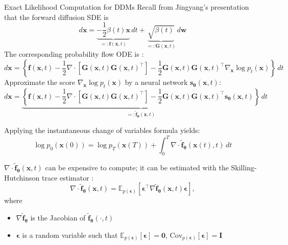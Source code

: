 \documentclass{beamer}
\begin{document}
\begin{frame}[allowframebreaks]{Exact Likelihood Computation for DDMs}
    Recall from Jingyang's presentation that the forward diffusion SDE is 
    \[
    d\mathbf{x} = \underbrace{-\frac{1}{2}\beta(t)\mathbf{x}}_{=: \mathbf{f}(\mathbf{x}, t)}\,dt + \underbrace{\sqrt{\beta(t)}}_{=: \mathbf{G}(\mathbf{x}, t)}\,d\mathbf{w}
    \]
    The corresponding probability flow ODE is \cite{song2021scor}:
    \[
    d\mathbf{x}
    = \left\{\mathbf{f}(\mathbf{x}, t) - \frac{1}{2}\nabla \cdot \left[\mathbf{G}(\mathbf{x}, t)\mathbf{G}(\mathbf{x}, t)^{\top}\right] - \frac{1}{2}\mathbf{G}(\mathbf{x}, t)\mathbf{G}(\mathbf{x}, t)^{\top}\nabla_{\mathbf{x}}\log p_t(\mathbf{x})\right\}\,dt
    \]
    Approximate the score $\nabla_{\mathbf{x}}\log p_t(\mathbf{x})$ by a neural network $\mathbf{s}_{\mathbf{\theta}}(\mathbf{x}, t)$:
    \[
    d\mathbf{x}
    = \underbrace{\left\{\mathbf{f}(\mathbf{x}, t) - \frac{1}{2}\nabla \cdot \left[\mathbf{G}(\mathbf{x}, t)\mathbf{G}(\mathbf{x}, t)^{\top}\right] - \frac{1}{2}\mathbf{G}(\mathbf{x}, t)\mathbf{G}(\mathbf{x}, t)^{\top}\mathbf{s}_{\mathbf{\theta}}(\mathbf{x}, t)\right\}}_{=: \mathbf{\tilde{f}}_{\mathbf{\theta}}(\mathbf{x}, t)}\,dt
    \]

    \framebreak

    Applying the instantaneous change of variables formula \cite{chen2018neur} yields:
    \begin{equation}\label{eq:chg_of_var_result}
        \log p_0(\mathbf{x}(0)) = \log p_T(\mathbf{x}(T)) + \int_{0}^{T} \nabla \cdot \mathbf{\tilde{f}}_{\mathbf{\theta}}(\mathbf{x}(t), t)\,dt
    \end{equation}

    $\nabla \cdot \mathbf{\tilde{f}}_{\mathbf{\theta}}(\mathbf{x}, t)$ can be expensive to compute; it can be estimated with the Skilling-Hutchinson trace estimator \cite{skilling1989thee, hutchinson1990stoc}:
    \[
    \nabla \cdot \mathbf{\tilde{f}}_{\mathbf{\theta}}(\mathbf{x}, t) = \mathbb{E}_{p(\mathbf{\epsilon})}[\mathbf{\epsilon}^{\top}\nabla\mathbf{\tilde{f}}_{\mathbf{\theta}}(\mathbf{x}, t)\mathbf{\epsilon}],
    \]
    where
    \begin{itemize}
        \item $\nabla\mathbf{\tilde{f}}_{\mathbf{\theta}}$ is the Jacobian of $\mathbf{\tilde{f}}_{\mathbf{\theta}}(\cdot, t)$
        \item $\mathbf{\epsilon}$ is a random variable such that $\mathbb{E}_{p(\mathbf{\epsilon})}[\mathbf{\epsilon}] = \mathbf{0}$, $\text{Cov}_{p(\mathbf{\epsilon})}[\mathbf{\epsilon}] = \mathbf{I}$
    \end{itemize}


\end{frame}
\end{document}
